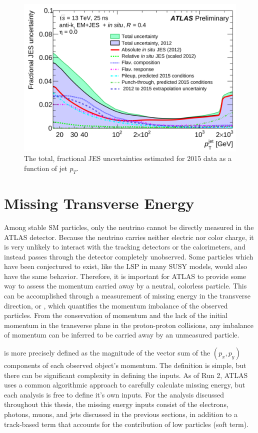 \begin{figure}
\includegraphics[width=\fullfig]{figures/reco_jes_pt.png}
\caption{The total, fractional \ac{JES} uncertainties estimated for 2015 data as a function of jet $p_T$.}
\label{fig:reco_jesunc}
\end{figure}


\section{Missing Transverse Energy}
\label{sec:missing_energy}

Among stable \ac{SM} particles, only the neutrino cannot be directly measured in the ATLAS detector. 
Because the neutrino carries neither electric nor color charge, it is very unlikely to interact with the tracking detectors or the calorimeters, and instead passes through the detector completely unobserved.
Some particles which have been conjectured to exist, like the \ac{LSP} in many \ac{SUSY} models, would also have the same behavior.
Therefore, it is important for ATLAS to provide some way to assess the momentum carried away by a neutral, colorless particle.
This can be accomplished through a measurement of missing energy in the transverse direction, or \met, which quantifies the momentum imbalance of the observed particles.
From the conservation of momentum and the lack of the initial momentum in the transverse plane in the proton-proton collisions, any imbalance of momentum can be inferred to be carried away by an unmeasured particle.

\met is more precisely defined as the magnitude of the vector sum of the $(p_x,p_y)$ components of each observed object's momentum.
The definition is simple, but there can be significant complexity in defining the inputs.
As of Run 2, ATLAS uses a common algorithmic approach to carefully calculate missing energy, but each analysis is free to define it's own inputs.
For the analysis discussed throughout this thesis, the missing energy inputs consist of the electrons, photons, muons, and jets discussed in the previous sections, in addition to a track-based term that accounts for the contribution of low \pt particles (soft term).

